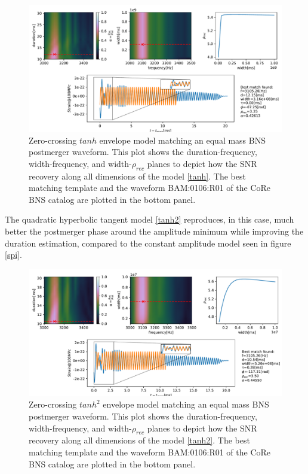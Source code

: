 \begin{figure}[hbt!]
\begin{center}
\includegraphics[width=\textwidth, angle=0]{images/Data_analysis/results/envel_110_tanh.pdf}
\captionsetup{width=0.8\textwidth}
\caption[Zero-crossing $tanh$ envelope model matching a spinning BNS postmerger waveform]{Zero-crossing $tanh$ envelope model matching an equal mass BNS postmerger waveform. This plot shows the duration-frequency, width-frequency, and width-$\rho_{rec}$ planes to depict how the SNR recovery along all dimensions of the model \ref{tanh}. The best matching template and the waveform BAM:0106:R01 of the CoRe BNS catalog \cite{Dietrich:2018phi} are plotted in the bottom panel.}
\end{center}
\end{figure}

\FloatBarrier

The quadratic hyperbolic tangent model \ref{tanh2} reproduces, in this case, much better the postmerger phase around the amplitude minimum while improving the duration estimation, compared to the constant amplitude model seen in figure \ref{spi}.

\begin{figure}[hbt!]
\begin{center}
\includegraphics[width=\textwidth, angle=0]{images/Data_analysis/results/envel_110_tanh2.pdf}
\captionsetup{width=0.8\textwidth}
\caption[Zero-crossing $tanh^2$ envelope model matching a spinning BNS postmerger waveform]{Zero-crossing $tanh^2$ envelope model matching an equal mass BNS postmerger waveform. This plot shows the duration-frequency, width-frequency, and width-$\rho_{rec}$ planes to depict how the SNR recovery along all dimensions of the model \ref{tanh2}. The best matching template and the waveform BAM:0106:R01 of the CoRe BNS catalog \cite{Dietrich:2018phi} are plotted in the bottom panel.}
\end{center}
\end{figure}

